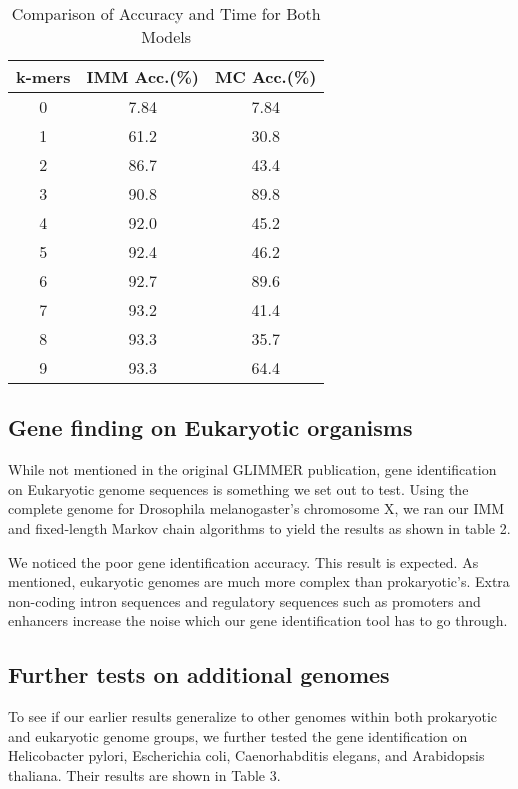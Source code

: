 \documentclass[11pt,letterpaper]{article}
\begin{document}
\begin{table}
	\begin{center}
		\begin{tabular}{|c|c|c|}
			\hline \bf k-mers & \bf IMM Acc.(\%) & \bf MC Acc.(\%) \\ \hline
			0 & 7.84 & 7.84 \\
			\hline
			1 & 61.2 & 30.8 \\
			\hline
			2 & 86.7 & 43.4 \\
			\hline		
			3 & 90.8 & 89.8 \\
			\hline		
			4 & 92.0 & 45.2 \\
			\hline		
			5 & 92.4 & 46.2 \\
			\hline
			6 & 92.7 & 89.6 \\
			\hline													
			7 & 93.2 & 41.4 \\
			\hline		
			8 & 93.3 & 35.7 \\
			\hline			
			9 & 93.3 & 64.4 \\
			\hline		
		\end{tabular}
	\end{center}
	\caption{\label{font-table} Comparison of Accuracy and Time for Both Models }
\end{table}

\subsection{Gene finding on Eukaryotic organisms}
While not mentioned in the original GLIMMER publication, gene identification on Eukaryotic genome sequences is something we set out to test. Using the complete genome for Drosophila melanogaster’s chromosome X, we ran our IMM and fixed-length Markov chain algorithms to yield the results as shown in table 2.

We noticed the poor gene identification accuracy. This result is expected. As mentioned, eukaryotic genomes are much more complex than prokaryotic’s. Extra non-coding intron sequences and regulatory sequences such as promoters and enhancers increase the noise which our gene identification tool has to go through. 

\subsection{Further tests on additional genomes}

To see if our earlier results generalize to other genomes within both prokaryotic and eukaryotic genome groups, we further tested the gene identification on Helicobacter pylori, Escherichia coli, Caenorhabditis elegans, and Arabidopsis thaliana. Their results are shown in Table 3. 
\end{document}

